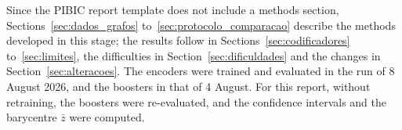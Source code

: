 Since the PIBIC report template does not include a methods section, Sections~\ref{sec:dados_grafos} to~\ref{sec:protocolo_comparacao} describe the methods developed in this stage; the results follow in Sections~\ref{sec:codificadores} to~\ref{sec:limites}, the difficulties in Section~\ref{sec:dificuldades} and the changes in Section~\ref{sec:alteracoes}. The encoders were trained and evaluated in the run of 8 August 2026, and the boosters in that of 4 August. For this report, without retraining, the boosters were re-evaluated, and the confidence intervals and the barycentre $\bar{z}$ were computed.
